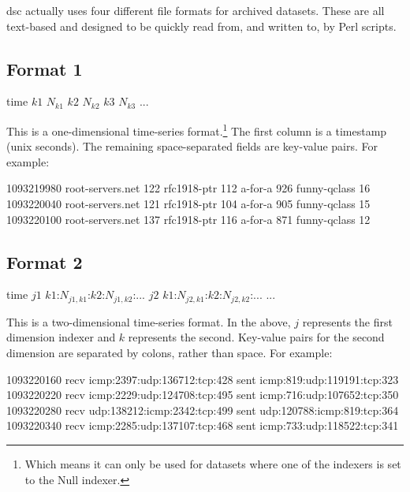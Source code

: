 \documentclass{report}
\def\dsc{{\sc dsc}}
\begin{document}
{\dsc} actually uses four different file formats for archived
datasets.  These are all text-based and designed to be quickly
read from, and written to, by Perl scripts.  

\subsection{Format 1}

\noindent
\begin{tt}time $k1$ $N_{k1}$ $k2$ $N_{k2}$ $k3$ $N_{k3}$ ...
\end{tt}

\vspace{1ex}\noindent
This is a one-dimensional time-series format.\footnote{Which means
it can only be used for datasets where one of the indexers is set
to the Null indexer.}  The first column is a timestamp (unix seconds).
The remaining space-separated fields are key-value pairs.  For
example:

\begin{MyVerbatim}
1093219980 root-servers.net 122 rfc1918-ptr 112 a-for-a 926 funny-qclass 16
1093220040 root-servers.net 121 rfc1918-ptr 104 a-for-a 905 funny-qclass 15
1093220100 root-servers.net 137 rfc1918-ptr 116 a-for-a 871 funny-qclass 12
\end{MyVerbatim}

\subsection{Format 2}

\noindent
\begin{tt}time $j1$ $k1$:$N_{j1,k1}$:$k2$:$N_{j1,k2}$:... $j2$ $k1$:$N_{j2,k1}$:$k2$:$N_{j2,k2}$:... ...
\end{tt}

\vspace{1ex}\noindent
This is a two-dimensional time-series format.  In the above,
$j$ represents the first dimension indexer and $k$ represents
the second.  Key-value pairs for the second dimension are
separated by colons, rather than space.  For example:

\begin{MyVerbatim}
1093220160 recv icmp:2397:udp:136712:tcp:428 sent icmp:819:udp:119191:tcp:323
1093220220 recv icmp:2229:udp:124708:tcp:495 sent icmp:716:udp:107652:tcp:350
1093220280 recv udp:138212:icmp:2342:tcp:499 sent udp:120788:icmp:819:tcp:364
1093220340 recv icmp:2285:udp:137107:tcp:468 sent icmp:733:udp:118522:tcp:341
\end{MyVerbatim}
\end{document}
